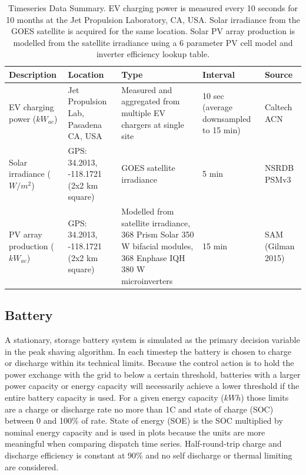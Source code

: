 \documentclass[journal,article,submit,pdftex,moreauthors]{Definitions/mdpi}
\begin{document}
\begin{table}[!h]
  \centering
  \caption{Timeseries Data Summary. EV charging power is
  measured every 10 seconds for 10 months at the Jet Propulsion
  Laboratory, CA, USA. Solar irradiance from the GOES satellite is
  acquired for the same location. Solar PV array production is modelled
  from the satellite irradiance using a 6 parameter PV cell model and
  inverter efficiency lookup table.\label{tab:loadsectors}}
  \label{tab:data-summary}
  \begin{tabularx}{\linewidth}{XXXXX}
  \toprule
  Description & Location & Type & Interval & Source  \\
  \midrule
  EV charging power ($kW_{ac}$) & Jet Propulsion Lab, Pasadena CA, USA & Measured and aggregated from multiple  EV chargers at single site & 10 sec (average downsampled to 15 min) & Caltech ACN \\
  Solar irradiance ($W/m^2$)   & GPS: 34.2013, -118.1721 (2x2 km square) & GOES satellite irradiance & 5 min & NSRDB PSMv3 \\
  PV array production ($kW_{ac}$) & GPS: 34.2013, -118.1721 (2x2 km square) & Modelled from satellite irradiance, 368 Prism Solar 350 W bifacial modules, 368 Enphase IQH 380 W microinverters & 15 min & SAM (Gilman 2015) \\

  \bottomrule
  \end{tabularx}
\end{table}

\subsection{Battery}\label{battery}%

A stationary, storage battery system is simulated as the primary
decision variable in the peak shaving algorithm. In each timestep the
battery is chosen to charge or discharge within its technical limits.
Because the control action is to hold the power exchange with the grid
to below a certain threshold, batteries with a larger power capacity or
energy capacity will necessarily achieve a lower threshold if the entire
battery capacity is used. For a given energy capacity (\(kWh\)) those
limits are a charge or discharge rate no more than 1C and state of
charge (SOC) between 0 and 100\% of rate. State of energy (SOE) is the
SOC multiplied by nominal energy capacity and is used in plots because
the units are more meaningful when comparing dispatch time series.
Half-round-trip charge and discharge efficiency is constant at 90\% and
no self discharge or thermal limiting are considered.
\end{document}
